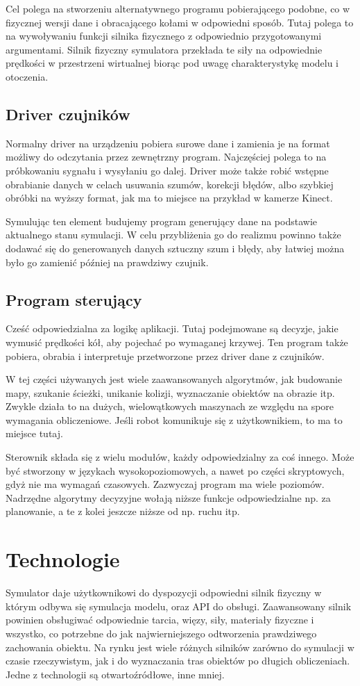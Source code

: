  Cel polega na stworzeniu alternatywnego programu pobierającego podobne, co w fizycznej wersji dane i obracającego kołami w odpowiedni sposób.
 Tutaj polega to na wywoływaniu funkcji silnika fizycznego z odpowiednio przygotowanymi argumentami.
 Silnik fizyczny symulatora przekłada te siły na odpowiednie prędkości w przestrzeni wirtualnej biorąc pod uwagę charakterystykę modelu i otoczenia.
 
 \subsection{Driver czujników}
 Normalny driver na urządzeniu pobiera surowe dane i zamienia je na format możliwy do odczytania przez zewnętrzny program.
 Najczęściej polega to na próbkowaniu sygnału i wysyłaniu go dalej.
 Driver może także robić wstępne obrabianie danych w celach usuwania szumów, korekcji błędów, albo szybkiej obróbki na wyższy format, jak ma to miejsce na przykład w kamerze Kinect.
 
 Symulując ten element budujemy program generujący dane na podstawie aktualnego stanu symulacji. 
 W celu przybliżenia go do realizmu powinno także dodawać się do generowanych danych sztuczny szum i błędy, aby łatwiej można było go zamienić później na prawdziwy czujnik.
 
\subsection{Program sterujący}
 Cześć odpowiedzialna za logikę aplikacji. Tutaj podejmowane są decyzje, jakie wymusić prędkości kół, aby pojechać po wymaganej krzywej.
 Ten program także pobiera, obrabia i interpretuje przetworzone przez driver dane z czujników.
 
 W tej części używanych jest wiele zaawansowanych algorytmów, jak budowanie mapy, szukanie ścieżki, unikanie kolizji, wyznaczanie obiektów na obrazie itp.
 Zwykle działa to na dużych, wielowątkowych maszynach ze względu na spore wymagania obliczeniowe.
 Jeśli robot komunikuje się z użytkownikiem, to ma to miejsce tutaj.
 
 Sterownik składa się z wielu modułów, każdy odpowiedzialny za coś innego. Może być stworzony w językach wysokopoziomowych, a nawet po części skryptowych, gdyż nie ma wymagań czasowych.
 Zazwyczaj program ma wiele poziomów. Nadrzędne algorytmy decyzyjne wołają niższe funkcje odpowiedzialne np. za planowanie, a te z kolei jeszcze niższe od np. ruchu itp.

\section{Technologie}
Symulator daje użytkownikowi do dyspozycji odpowiedni silnik fizyczny w którym odbywa się symulacja modelu, oraz API do obsługi.
Zaawansowany silnik powinien obsługiwać odpowiednie tarcia, więzy, siły, materiały fizyczne i wszystko, co potrzebne do jak najwierniejszego odtworzenia prawdziwego zachowania obiektu.
Na rynku jest wiele różnych silników zarówno do symulacji w czasie rzeczywistym, jak i do wyznaczania tras obiektów po długich obliczeniach.
Jedne z technologii są otwartoźródłowe, inne mniej.

